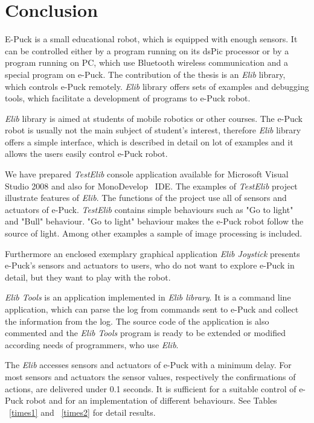 \documentclass[12pt,notitlepage]{report}
\begin{document}
\chapter{Conclusion} \label{chap:conclusion}
	E-Puck is a small educational robot, which is equipped with enough sensors. It can be controlled either
	by a program running on its dsPic processor or by a program running on PC, 
	which use Bluetooth wireless communication and 
	a special program on e-Puck.
	The contribution of the thesis is an {\it Elib} library, which controls e-Puck remotely.
	{\it Elib} library offers sets of examples and debugging tools, which facilitate a development 
	of programs to e-Puck robot.

	{\it Elib} library is aimed at students of mobile robotics or other courses.
	The e-Puck robot is usually not the main subject of student's interest, therefore
	{\it Elib} library offers a simple interface, which is described in detail on lot of examples and 
	it allows the users easily control e-Puck robot.

	We have prepared {\it TestElib} console application available for Microsoft Visual Studio 2008 \cite{msvs} and also
	for MonoDevelop~\cite{monodev} IDE. The examples of {\it TestElib} project illustrate features of {\it Elib}.
	The functions of the project use all of sensors and actuators of e-Puck.
	{\it TestElib} contains simple behaviours such as "Go to light" and "Bull" behaviour. "Go to light" behaviour
	makes the e-Puck robot follow the source of light.
	Among other examples a sample of image processing is included.

	Furthermore an enclosed exemplary graphical application {\it Elib Joystick}  presents e-Puck's sensors and actuators
	to users, who do not want to explore e-Puck in detail, but they want to play with the robot.

	{\it Elib Tools} is an application implemented in {\it Elib library}. It is a command line application, 
	which can parse the log from commands sent to e-Puck and collect the information from the log.
	The source code of the application is also commented and the {\it Elib Tools} program is  ready to be extended 
	or modified according needs of programmers, who use {\it Elib}.

	The {\it Elib} accesses sensors and actuators of e-Puck with a minimum delay. 
	For most sensors and actuators the sensor values, respectively the confirmations of actions,
	are delivered under 0.1 seconds. 
	It is sufficient for a suitable control of e-Puck robot and for an implementation of different behaviours.
	See Tables ~\ref{times1} and ~\ref{times2} for detail results.
\end{document}
